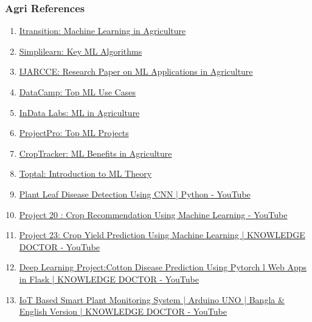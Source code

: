 \begin{frame}[fragile]\frametitle{Agri References}
    \begin{enumerate}
        \item \href{https://www.itransition.com/machine-learning/agriculture}{Itransition: Machine Learning in Agriculture}
        \item \href{https://www.simplilearn.com/10-algorithms-machine-learning-engineers-need-to-know-article}{Simplilearn: Key ML Algorithms}
        \item \href{https://www.ijarcce.com/upload/2016/april-16/IJARCCE%2087.pdf}{IJARCCE: Research Paper on ML Applications in Agriculture}
        \item \href{https://www.datacamp.com/blog/top-machine-learning-use-cases-and-algorithms}{DataCamp: Top ML Use Cases}
        \item \href{https://indatalabs.com/blog/ml-in-agriculture}{InData Labs: ML in Agriculture}
        \item \href{https://www.projectpro.io/article/top-10-machine-learning-projects-for-beginners-in-2021/397}{ProjectPro: Top ML Projects}
        \item \href{https://www.croptracker.com/blog/what-is-machine-learning-how-will-it-benefit-agriculture.html}{CropTracker: ML Benefits in Agriculture}
        \item \href{https://www.toptal.com/machine-learning/machine-learning-theory-an-introductory-primer}{Toptal: Introduction to ML Theory}
		\item \href{https://www.youtube.com/watch?v=zcq5aw9t-Ds}{Plant Leaf Disease Detection Using CNN | Python - YouTube}		
		\item \href{https://www.youtube.com/watch?v=T7\_GR8l-N5A}{Project 20 : Crop Recommendation Using Machine Learning - YouTube}		
		\item \href{https://www.youtube.com/watch?v=LEnjAR6AwOo}{Project 23: Crop Yield Prediction Using Machine Learning | KNOWLEDGE DOCTOR - YouTube}
		\item \href{https://www.youtube.com/watch?v=Yj-lHSfovw4}{Deep Learning Project:Cotton Disease Prediction Using Pytorch l Web Apps in Flask | KNOWLEDGE DOCTOR - YouTube}
		\item \href{https://www.youtube.com/watch?v=59H5\_1Q4lqU}{IoT Based Smart Plant Monitoring System | Arduino UNO | Bangla \& English Version | KNOWLEDGE DOCTOR - YouTube}
    \end{enumerate}
\end{frame}
